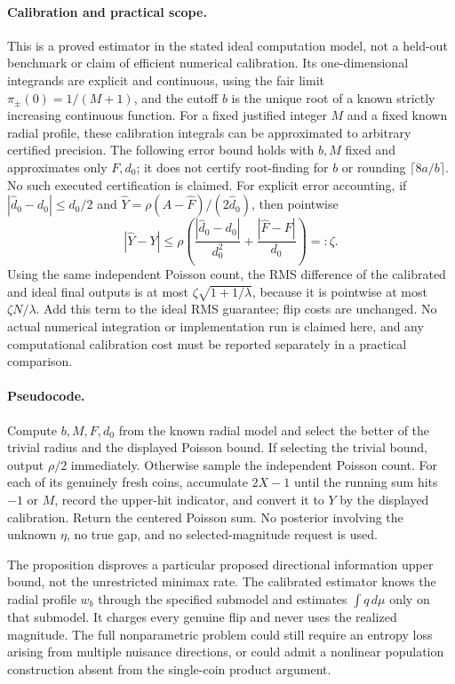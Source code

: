 \paragraph{Calibration and practical scope.}
This is a proved estimator in the stated ideal computation model, not a
held-out benchmark or claim of efficient numerical calibration. Its
one-dimensional integrands are explicit and continuous, using the fair
limit $\pi_\pm(0)=1/(M+1)$, and the cutoff $b$ is the unique root of a
known strictly increasing continuous function. For a fixed justified integer
$M$ and a fixed known radial profile, these calibration integrals can be
approximated to arbitrary certified precision. The following error bound
holds with $b,M$ fixed and approximates only $F,d_0$; it does not certify
root-finding for $b$ or rounding $\lceil8a/b\rceil$. No such executed
certification is claimed. For explicit error accounting, if
$|\widehat d_0-d_0|\le d_0/2$ and
$\widehat Y=\rho(A-\widehat F)/(2\widehat d_0)$, then pointwise
\[
 |\widehat Y-Y|
 \le\rho\left(\frac{|\widehat d_0-d_0|}{d_0^2}
                 +\frac{|\widehat F-F|}{d_0}\right)=:\zeta.
\]
Using the same independent Poisson count, the RMS difference of the
calibrated and ideal final outputs is at most
$\zeta\sqrt{1+1/\lambda}$, because it is pointwise at most
$\zeta N/\lambda$. Add this term to the ideal RMS guarantee; flip costs
are unchanged. No actual numerical integration or implementation run is
claimed here, and any computational calibration cost must be reported
separately in a practical comparison.

\paragraph{Pseudocode.}
Compute $b,M,F,d_0$ from the known radial model and select the better of
the trivial radius and the displayed Poisson bound. If selecting the
trivial bound, output $\rho/2$ immediately. Otherwise sample the independent
Poisson count. For each of its genuinely fresh coins, accumulate $2X-1$
until the running sum hits $-1$ or $M$, record the upper-hit indicator,
and convert it to $Y$ by the displayed calibration. Return the centered
Poisson sum. No posterior involving the unknown $\eta$, no true gap,
and no selected-magnitude request is used.

The proposition disproves a particular proposed directional information
upper bound, not the unrestricted minimax rate. The calibrated estimator
knows the radial profile $w_b$ through the specified submodel and estimates
$\int q\,d\mu$ only on that submodel. It charges every
genuine flip and never uses the realized magnitude. The full nonparametric
problem could still require an entropy loss arising from multiple nuisance
directions, or could admit a nonlinear population construction absent from
the single-coin product argument.
